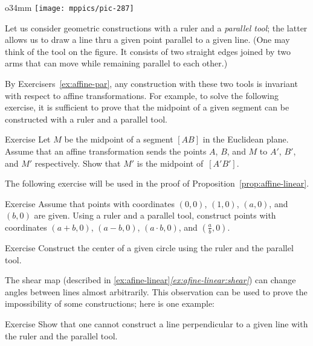 \begin{wrapfigure}{o}{34mm}
\vskip-15mm
\centering
\texttt{[image: mppics/pic-287]}
\end{wrapfigure}

Let us consider geometric constructions with a ruler and a \emph{parallel tool};
the latter allows us to draw a line thru a given point parallel to a given line.
(One may think of the tool on the figure.
It consists of two straight edges joined by two arms that can move while remaining parallel to each other.)

By Exercisers~\ref{ex:affine-par}, any construction with these two tools is invariant with respect to affine transformations.
For example, 
to solve the following exercise,
it is sufficient to prove that the midpoint of a given segment can be constructed with a ruler and a parallel tool.

\begin{thm}{Exercise}\label{ex:midpoint-affine}
Let $M$ be the  midpoint of a segment $[AB]$ in the Euclidean plane.
Assume that an affine transformation sends the points $A$, $B$, and $M$
to $A'$, $B'$, and $M'$ respectively.
Show that $M'$ is the midpoint of~$[A'B']$.
\end{thm}

The following exercise will be used in the proof of Proposition~\ref{prop:affine-linear}.

\begin{thm}{Exercise}\label{ex:R-hom}
Assume that points with coordinates $(0,0)$, $(1,0)$, $(a,0)$, and $(b,0)$ are given.
Using a ruler and a parallel tool, construct points with coordinates $(a+b,0)$, $(a-b,0)$, $(a\cdot b,0)$, and $(\tfrac a b,0)$.
\end{thm}

\begin{thm}{Exercise}\label{ex:center-circ-affine}
Construct the center of a given circle using the ruler and the parallel tool.
\end{thm}

The shear map (described in \ref{ex:afine-linear}\textit{\ref{ex:afine-linear:shear}}) can change angles between lines almost arbitrarily.
This observation can be used to prove the impossibility of some constructions;
here is one example:

\begin{thm}{Exercise}\label{ex:affine-perp}
Show that one cannot construct a line perpendicular to a given line with the ruler and the parallel tool.
\end{thm}


